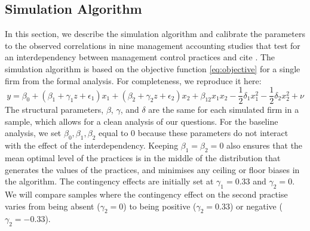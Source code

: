 \documentclass[12pt]{article}
\begin{document}
\subsection{Simulation Algorithm}

In this section, we describe the simulation algorithm and calibrate the parameters to the observed correlations in nine management accounting studies that test for an interdependency between management control practices and cite \citet{grabner_management_2013}. The simulation algorithm is based on the objective function \eqref{eq:objective} for a single firm from the formal analysis. For completeness, we reproduce it here:
\begin{equation*}
y  = \beta_0 + (\beta_{1} + \gamma_1 z + \epsilon_1) x_1 
						+ (\beta_{2} + \gamma_2 z  + \epsilon_2) x_2 
                        + \beta_{12} x_1 x_2 - \frac{1}{2}\delta_1 x^2_1 - \frac{1}{2}\delta_2 x^2_2 + \nu
\end{equation*}
The structural parameters, $\beta$, $\gamma$, and $\delta$ are the same for each simulated firm in a sample, which allows for a clean analysis of our questions. For the baseline analysis, we set $\beta_0, \beta_{1}, \beta_{2}$ equal to $0$ because these parameters do not interact with the effect of the interdependency. Keeping $\beta_{1} = \beta_{2} = 0$ also ensures that the mean optimal level of the practices is in the middle of the distribution that generates the values of the practices, and minimises any ceiling or floor biases in the algorithm. The contingency effects are initially set at $\gamma_1 = 0.33$ and $\gamma_2 = 0$. We will compare samples where the contingency effect on the second practise varies from being absent ($\gamma_2 = 0$) to being positive ($\gamma_2 = 0.33$) or negative ($\gamma_2 = -0.33$).  
\end{document}
